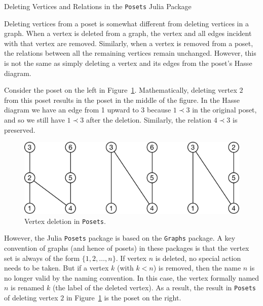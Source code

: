 \documentclass[12pt]{article}
\begin{document}
\begin{center}
  \large
  Deleting Vertices and Relations in the \texttt{Posets} Julia Package
\end{center}


Deleting vertices from a poset is somewhat different from deleting
vertices in a graph. When a vertex is deleted from a graph, the vertex
and all edges incident with that vertex are removed. Similarly, when
a vertex is removed from a poset, the relations between all the
remaining vertices remain unchanged. However, this is not the same as
simply deleting a vertex and its edges from the poset's Hasse
diagram. 

Consider the poset on the left in Figure~\ref{fig:vertex-deletion}. 
Mathematically, deleting vertex $2$ from this poset results in the
poset in the middle of the figure. In the Hasse diagram we have an
edge from 1 upward to 3 because $1\prec 3$ in the original poset, and
so we still have $1 \prec 3$ after the deletion. Similarly, the
relation $4\prec3$ is preserved.

\begin{figure}[h]
\begin{framed}
  \begin{center}
    \includegraphics[scale=0.4]{vertex-deletion}
  \end{center}
  \caption{Vertex deletion in \texttt{Posets}.}
  \label{fig:vertex-deletion}
\end{framed}
\end{figure}

However, the Julia \texttt{Posets} package is based on the
\texttt{Graphs} package. A key convention of graphs (and hence of
posets) in these packages is that the vertex set is always of the form
$\{1,2,\ldots,n\}$. If vertex $n$ is deleted, no special action needs
to be taken. But if a vertex $k$ (with $k<n$) is removed, then the
name $n$ is no longer valid by the naming convention. In this case,
the vertex formally named $n$ is renamed $k$ (the label of the deleted
vertex). As a result, the result in \texttt{Posets} of deleting vertex
$2$ in Figure~\ref{fig:vertex-deletion} is the poset on the right.
\end{document}
